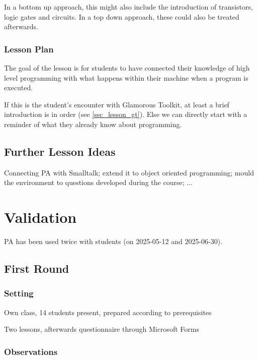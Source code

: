 In a bottom up approach, this might also include the introduction of transistors, logic gates and circuits. In a top down approach, these could also be treated afterwards.

\subsection{Lesson Plan}
The goal of the lesson is for students to have connected their knowledge of high level programming with what happens within their machine when a program is executed.

If this is the student's encounter with Glamorous Toolkit, at least a brief introduction is in order (see \ref{ssc_lesson_gt}). Else we can directly start with a reminder of what they already know about programming.




\section{Further Lesson Ideas} \label{sc_lesson_other}
Connecting PA with Smalltalk; extend it to object oriented programming; mould the environment to questions developed during the course; ...

\chapter{Validation} \label{ch_practice}
PA has been used twice with students (on 2025-05-12 and 2025-06-30).

\section{First Round} \label{sc_validation_ca}
\subsection{Setting}

\begin{todo}
\item Own class, 14 students present, prepared according to prerequisites
\item Two lessons, afterwards questionnaire through Microsoft Forms
\end{todo}

\subsection{Observations}

